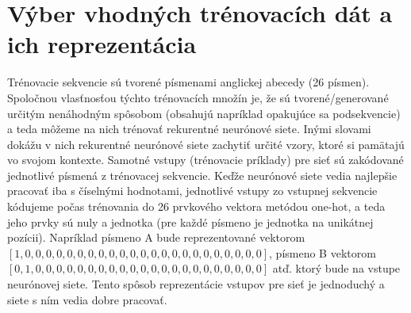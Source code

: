 \section{Výber vhodných trénovacích dát a ich reprezentácia}
Trénovacie sekvencie sú tvorené písmenami anglickej abecedy (26 písmen).
Spoločnou vlasťnosťou týchto trénovacích množín je, že sú tvorené/generované určitým nenáhodným spôsobom (obsahujú napríklad opakujúce sa podsekvencie)
a teda môžeme na nich trénovať rekurentné neurónové siete. 
Inými slovami dokážu v nich rekurentné neurónové siete zachytiť určité vzory, ktoré si pamätajú vo svojom kontexte.
Samotné vstupy (trénovacie príklady) pre sieť sú zakódované jednotlivé písmená z trénovacej sekvencie.
Keďže neurónové siete vedia najlepšie pracovať iba s číselnými hodnotami, jednotlivé vstupy zo 
vstupnej sekvencie kódujeme počas trénovania do 26 prvkového vektora metódou one-hot, 
a teda jeho prvky sú nuly a jednotka (pre každé písmeno je jednotka na unikátnej pozícii).
Napríklad písmeno A bude reprezentované vektorom
$[1, 0, 0, 0, 0, 0, 0, 0, 0, 0, 0, 0, 0, 0, 0, 0, 0, 0, 0, 0, 0, 0, 0, 0]$,
písmeno B vektorom $[0, 1, 0, 0, 0, 0, 0, 0, 0, 0, 0, 0, 0, 0, 0, 0, 0, 0, 0, 0, 0, 0, 0, 0]$ atď. 
ktorý bude na vstupe neurónovej siete.
Tento spôsob reprezentácie vstupov pre sieť je jednoduchý a siete s ním vedia dobre pracovať.


%









